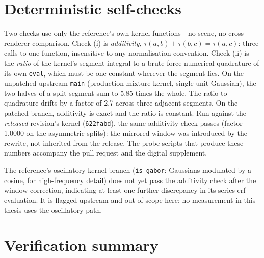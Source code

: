 \section{Deterministic self-checks}
\label{app:corrections-probes}

Two checks use only the reference's own kernel functions---no scene, no cross-renderer
comparison. Check (i) is \emph{additivity}, $\tau(a,b) + \tau(b,c) = \tau(a,c)$: three calls
to one function, insensitive to any normalisation convention. Check (ii) is the \emph{ratio}
of the kernel's segment integral to a brute-force numerical quadrature of its own
\texttt{eval}, which must be one constant wherever the segment lies. On the unpatched
upstream \texttt{main} (production mixture kernel, single unit Gaussian), the two halves of
a split segment sum to \num{5.85} times the whole. The ratio to quadrature drifts by a
factor of \num{2.7} across three adjacent segments. On the patched branch, additivity is
exact and the ratio is constant. Run against the \emph{released} revision's kernel
(\texttt{622fabd}), the same additivity check passes (factor \num{1.0000} on the
asymmetric splits): the mirrored window was introduced by the rewrite, not inherited from
the release. The probe scripts that produce these numbers accompany
the pull request and the digital supplement.

The reference's oscillatory kernel branch (\texttt{is\_gabor}: Gaussians modulated by a
cosine, for high-frequency detail) does not yet pass the additivity check after the window
correction, indicating at least one further discrepancy in its series-erf evaluation. It is
flagged upstream and out of scope here: no measurement in this thesis uses the oscillatory
path.

\section{Verification summary}
\label{app:corrections-verification}

